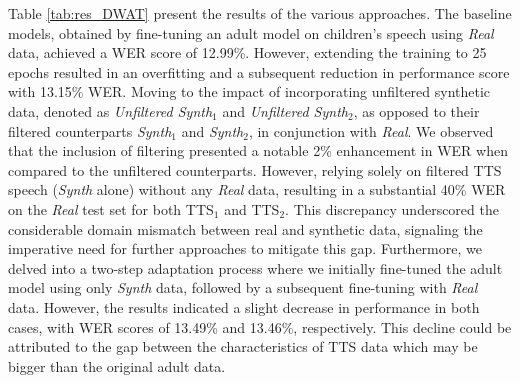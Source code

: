 Table \ref{tab:res_DWAT} present the results of the various approaches. The baseline models, obtained by fine-tuning an adult model on children's speech using \textit{Real} data, achieved a WER score of 12.99\%. However, extending the training to 25 epochs resulted in an overfitting and a subsequent reduction in performance score with 13.15\% WER.
Moving to the impact of incorporating unfiltered synthetic data, denoted as \textit{Unfiltered Synth$_1$} and \textit{Unfiltered Synth$_2$}, as opposed to their filtered counterparts \textit{Synth$_1$} and \textit{Synth$_2$}, in conjunction with \textit{Real}. We observed that the inclusion of filtering presented a notable 2\% enhancement in WER when compared to the unfiltered counterparts. However, relying solely on filtered TTS speech (\textit{Synth} alone) without any \textit{Real} data, resulting in a substantial 40\% WER on the \textit{Real} test set for both TTS$_1$ and TTS$_2$. This discrepancy underscored the considerable domain mismatch between real and synthetic data, signaling the imperative need for further approaches to mitigate this gap.
Furthermore, we delved into a two-step adaptation process where we initially fine-tuned the adult model using only \textit{Synth} data, followed by a subsequent fine-tuning with \textit{Real} data. However, the results indicated a slight decrease in performance in both cases, with WER scores of 13.49\% and 13.46\%, respectively. This decline could be attributed to the gap between the characteristics of TTS data which may be bigger than the original adult data.


